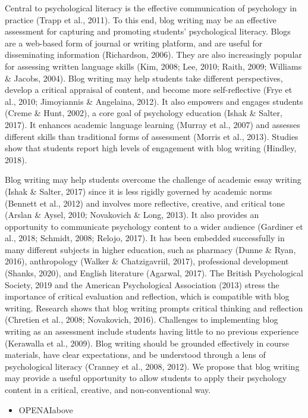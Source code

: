 \documentclass[
  11pt,
  letterpaper,
  oneside,
  open=any]{scrbook}
\providecommand{\tightlist}{%
  \setlength{\itemsep}{0pt}\setlength{\parskip}{0pt}}\usepackage{longtable,booktabs,array}
\begin{document}
Central to psychological literacy is the effective communication of
psychology in practice (Trapp et al., 2011). To this end, blog writing
may be an effective assessment for capturing and promoting students'
psychological literacy. Blogs are a web-based form of journal or writing
platform, and are useful for disseminating information (Richardson,
2006). They are also increasingly popular for assessing written language
skills (Kim, 2008; Lee, 2010; Raith, 2009; Williams \& Jacobs, 2004).
Blog writing may help students take different perspectives, develop a
critical appraisal of content, and become more self-reflective (Frye et
al., 2010; Jimoyiannis \& Angelaina, 2012). It also empowers and engages
students (Creme \& Hunt, 2002), a core goal of psychology education
(Ishak \& Salter, 2017). It enhances academic language learning (Murray
et al., 2007) and assesses different skills than traditional forms of
assessment (Morris et al., 2013). Studies show that students report high
levels of engagement with blog writing (Hindley, 2018).

Blog writing may help students overcome the challenge of academic essay
writing (Ishak \& Salter, 2017) since it is less rigidly governed by
academic norms (Bennett et al., 2012) and involves more reflective,
creative, and critical tone (Arslan \& Aysel, 2010; Novakovich \& Long,
2013). It also provides an opportunity to communicate psychology content
to a wider audience (Gardiner et al., 2018; Schmidt, 2008; Relojo,
2017). It has been embedded successfully in many different subjects in
higher education, such as pharmacy (Dunne \& Ryan, 2016), anthropology
(Walker \& Chatzigavriil, 2017), professional development (Shanks,
2020), and English literature (Agarwal, 2017). The British Psychological
Society, 2019 and the American Psychological Association (2013) stress
the importance of critical evaluation and reflection, which is
compatible with blog writing. Research shows that blog writing prompts
critical thinking and reflection (Chretien et al., 2008; Novakovich,
2016). Challenges to implementing blog writing as an assessment include
students having little to no previous experience (Kerawalla et al.,
2009). Blog writing should be grounded effectively in course materials,
have clear expectations, and be understood through a lens of
psychological literacy (Cranney et al., 2008, 2012). We propose that
blog writing may provide a useful opportunity to allow students to apply
their psychology content in a critical, creative, and non-conventional
way.

\begin{itemize}
\tightlist
\item
  OPENAIabove
\end{itemize}
\end{document}
